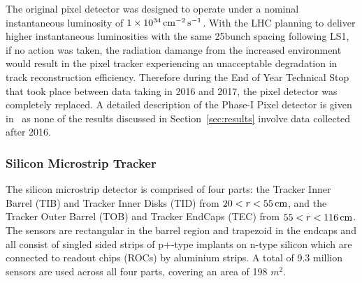 The original pixel detector was designed to operate under a nominal instantaneous luminosity of $1 \times 10^{34}\,\text{cm}^\text{$-$2}\,\text{s}^\text{$-$1}$.
With the LHC planning to deliver higher instantaneous luminosities with the same 25\ns bunch spacing following LS1, if no action was taken, the radiation damange from the increased \PU environment would result in the pixel tracker experiencing an unacceptable degradation in track reconstruction efficiency.
Therefore during the End of Year Technical Stop that took place between data taking in 2016 and 2017, the pixel detector was completely replaced.
A detailed description of the Phase-I Pixel detector is given in~\cite{CMS:2012sda} as none of the results discussed in Section~\ref{sec:results} involve data collected after 2016.


\subsubsection{Silicon Microstrip Tracker}
The silicon microstrip detector is comprised of four parts: the Tracker Inner Barrel (TIB) and Tracker Inner Disks (TID) from $20 < r < 55\,\text{cm}$, and the Tracker Outer Barrel (TOB) and Tracker EndCaps (TEC) from $55 < r < 116\,\text{cm}$.
The sensors are rectangular in the barrel region and trapezoid in the endcaps and all consist of singled sided strips of p+-type implants on n-type silicon which are connected to readout chips (ROCs) by aluminium strips.
A total of 9.3 million sensors are used across all four parts, covering an area of 198 $\unit{m}^{2}$.

